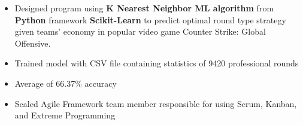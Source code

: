 







\smallskip
\begin{itemize}
\item Designed program using \textbf{K Nearest Neighbor ML algorithm} from \textbf{Python} framework \textbf{Scikit-Learn} to predict optimal round type strategy given teams' economy in popular video game Counter Strike: Global Offensive.
\smallskip
\item Trained model with CSV file containing statistics of 9420 professional rounds
\smallskip
\item Average of 66.37\% accuracy
\end{itemize}






\begin{itemize}
\item Scaled Agile Framework team member responsible for using Scrum, Kanban, and Extreme Programming
\end{itemize}



